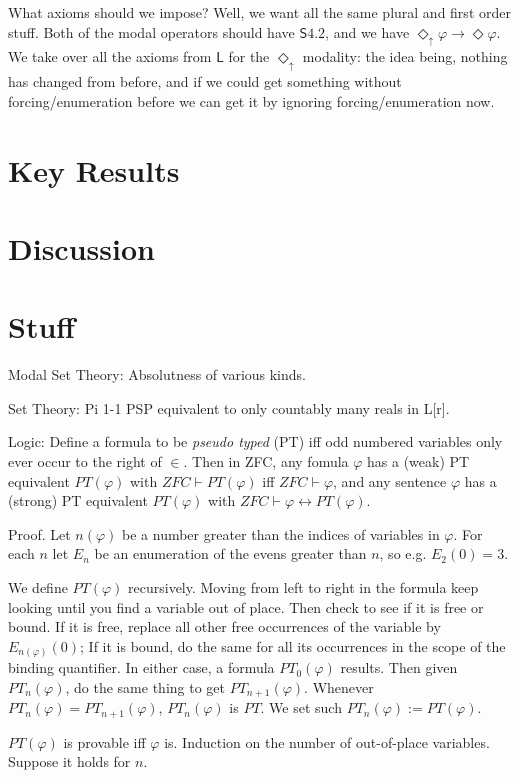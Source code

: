 \documentclass{article}
\newcommand{\du}{\Diamond_\uparrow}
\begin{document}
What axioms should we impose? Well, we want all the same plural and first order stuff.
Both of the modal operators should have $\mathsf{S4.2}$, and
we have $\du \varphi \rightarrow \Diamond \varphi$. We take over 
all the axioms from $\mathsf{L}$ for the $\du$ modality: the idea being, nothing 
has changed from before, and if we could get something without forcing/enumeration before 
we can get it by ignoring forcing/enumeration now.
\section{Key Results}
\section{Discussion}
\section{Stuff}
Modal Set Theory:
Absolutness of various kinds.

Set Theory: 
Pi 1-1 PSP equivalent to only countably many reals in L[r].

Logic: 
Define a formula to be \emph{pseudo typed} (PT) iff 
odd numbered variables only ever occur
to the right of $\in$. 
Then in ZFC, any fomula $\varphi$ has a (weak) PT equivalent
$PT(\varphi)$ with $ZFC \vdash PT(\varphi)$ iff $ZFC \vdash \varphi$, 
and any sentence 
$\varphi$ has a (strong) PT equivalent $PT(\varphi)$ with 
$ZFC \vdash \varphi \leftrightarrow PT(\varphi)$.

Proof. Let $n(\varphi)$ be a number greater than the indices of variables in 
$\varphi$. For each $n$ let $E_n$ be an enumeration of 
the evens greater than $n$, so e.g. $E_2(0)=3$. 

We define $PT(\varphi)$ recursively. Moving from left to right in the formula 
keep looking until you find a variable out of place. Then check to see 
if it is free or bound. If it is free, replace all other free occurrences of the 
variable by $E_{n(\varphi)}(0)$; If 
it is bound, do the same for all its occurrences in the scope 
of the binding quantifier. In either case, a formula $PT_0(\varphi)$
results. Then given $PT_n(\varphi)$, do the same thing to get $PT_{n+1}(\varphi)$.
Whenever $PT_n(\varphi) = PT_{n+1}(\varphi)$, $PT_n(\varphi)$ is $PT$. We set 
such $PT_n(\varphi) := PT(\varphi)$.

$PT(\varphi)$ is provable iff $\varphi$ is. Induction on the number of out-of-place 
variables. Suppose it holds for $n$. 
\end{document}
